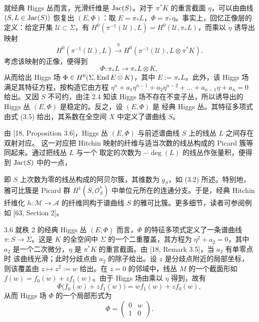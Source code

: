 就经典 Higgs 丛而言，光滑纤维是 $\operatorname{Jac}(S)$。对于 $\pi^*K$ 的重言截面 $\eta$，可以由曲线
$(S,L\in\operatorname{Jac}(S))$ 恢复出 $(E,\Phi)$：取 $E=\pi_*L$，$\Phi=\pi_*\eta$。事实上，回忆正像层的
定义：给定开集 $\mathcal{U}\subset\Sigma$，有
$H^0(\pi^{-1}(\mathcal{U}),L)=H^0(\mathcal{U},\pi_*L)$，而乘以 $\eta$ 诱导出映射
\[
H^0(\pi^{-1}(\mathcal{U}),L)\xrightarrow{\ \eta\ }H^0(\pi^{-1}(\mathcal{U}),L\otimes\pi^*K).
\]
考虑该映射的正像，便得到
\[
\Phi:\pi_*L\to\pi_*L\otimes K,
\]
从而给出 Higgs 场 $\Phi\in H^0(\Sigma,\operatorname{End} E\otimes K)$，其中 $E:=\pi_*L$。此外，该 Higgs 场
满足其特征方程，按构造它由方程
$\eta^n+a_1\eta^{n-1}+a_2\eta^{n-2}+\ldots+a_{n-1}\eta+a_n=0$ 给出。又因 $S$ 不可约，由注 2.4
知该 Higgs 场不存在不变子丛，所以诱导出的 Higgs 丛 $(E,\Phi)$ 是稳定的。反之，设 $(E,\Phi)$ 是
经典 Higgs 丛。其特征多项式由式 (3.5) 给出，其系数在全空间 $X$ 中定义了谱曲线 $S$。

由 [18, Proposition 3.6]，Higgs 丛 $(E,\Phi)$ 与前述谱曲线 $S$ 上的线丛 $L$ 之间存在双射对应。
这一对应把 Hitchin 映射的纤维与适当次数的线丛构成的 Picard 簇等同起来。通过把线丛 $L$ 与一个
取定的次数为 $-\deg(L)$ 的线丛作张量积，便得到 $\operatorname{Jac}(S)$ 中的一点，

即 $S$ 上次数为零的线丛构成的阿贝尔簇，其维数为 $g_S$，如 (3.2) 所述。特别地，雅可比簇是
Picard 群 $H^1(S,\mathcal{O}^*_S)$ 中单位元所在的连通分支。于是，经典 Hitchin 纤维化
$h:\mathcal{M}\to\mathcal{A}$ 的纤维同构于谱曲线 $S$ 的雅可比簇。更多细节，读者可参阅例如
[63, Section 2]。

\begin{exmp}{3.6}
就秩 2 的经典 Higgs 丛 $(E,\Phi)$ 而言，$\Phi$ 的特征多项式定义了一条谱曲线
$\pi:S\to\Sigma$。这是 $K$ 的全空间中 $\Sigma$ 的一个二重覆盖，其方程为 $\eta^2+a_2=0$，其中
$a_2$ 是一个二次微分，$\eta$ 是 $\pi^*K$ 的重言截面。由 [18, Remark 3.5]，当 $a_2$ 有单零点时
该曲线光滑；此时分歧点由 $a_2$ 的除子给出。设 $z$ 是分歧点附近的局部坐标，则该覆盖由
$z\mapsto z^2:=w$ 给出。在 $z=0$ 的邻域中，线丛 $M$ 的一个截面形如
$f(w)=f_0(w)+zf_1(w)$。由于 Higgs 场由乘以 $\eta$ 得到，故有
\[
\Phi\big(f_0(w)+zf_1(w)\big)=wf_1(w)+zf_0(w),
\]
从而 Higgs 场 $\Phi$ 的一个局部形式为
\[
\Phi=\begin{pmatrix} 0 & w\\ 1 & 0\end{pmatrix}.
\]
\end{exmp}

